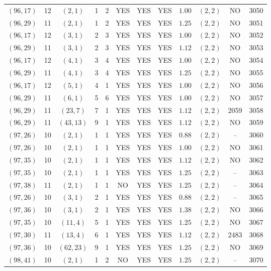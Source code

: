 \begin{longtable}{|c|c|c|c|c|c|c|c|c|c|c|c|}
$(96,17)$ & 12 & $(2,1)$ & 1 & 2 & YES & YES & YES & $1.00$ & $(2,2)$ & NO & 3050\\
$(96,29)$ & 11 & $(2,1)$ & 1 & 2 & YES & YES & YES & $1.25$ & $(2,2)$ & NO & 3051\\
$(96,17)$ & 12 & $(3,1)$ & 2 & 3 & YES & YES & YES & $1.00$ & $(2,2)$ & NO & 3052\\
$(96,29)$ & 11 & $(3,1)$ & 2 & 3 & YES & YES & YES & $1.12$ & $(2,2)$ & NO & 3053\\
$(96,17)$ & 12 & $(4,1)$ & 3 & 4 & YES & YES & YES & $1.00$ & $(2,2)$ & NO & 3054\\
$(96,29)$ & 11 & $(4,1)$ & 3 & 4 & YES & YES & YES & $1.25$ & $(2,2)$ & NO & 3055\\
$(96,17)$ & 12 & $(5,1)$ & 4 & 1 & YES & YES & YES & $1.00$ & $(2,2)$ & NO & 3056\\
$(96,29)$ & 11 & $(6,1)$ & 5 & 6 & YES & YES & YES & $1.00$ & $(2,2)$ & NO & 3057\\
$(96,29)$ & 11 & $(23,7)$ & 7 & 1 & YES & YES & YES & $1.12$ & $(2,2)$ & 2059 & 3058\\
$(96,29)$ & 11 & $(43,13)$ & 9 & 1 & YES & YES & YES & $1.12$ & $(2,2)$ & NO & 3059\\
$(97,26)$ & 10 & $(2,1)$ & 1 & 1 & YES & YES & YES & $0.88$ & $(2,2)$ & -- & 3060\\
$(97,26)$ & 10 & $(2,1)$ & 1 & 1 & YES & YES & YES & $1.00$ & $(2,2)$ & NO & 3061\\
$(97,35)$ & 10 & $(2,1)$ & 1 & 1 & YES & YES & YES & $1.12$ & $(2,2)$ & NO & 3062\\
$(97,35)$ & 10 & $(2,1)$ & 1 & 1 & YES & YES & YES & $1.25$ & $(2,2)$ & -- & 3063\\
$(97,38)$ & 11 & $(2,1)$ & 1 & 1 & NO & YES & YES & $1.25$ & $(2,2)$ & -- & 3064\\
$(97,26)$ & 10 & $(3,1)$ & 2 & 1 & YES & YES & YES & $0.88$ & $(2,2)$ & -- & 3065\\
$(97,36)$ & 10 & $(3,1)$ & 2 & 1 & YES & YES & YES & $1.38$ & $(2,2)$ & NO & 3066\\
$(97,35)$ & 10 & $(11,4)$ & 5 & 1 & YES & YES & YES & $1.25$ & $(2,2)$ & NO & 3067\\
$(97,30)$ & 11 & $(13,4)$ & 6 & 1 & YES & YES & YES & $1.12$ & $(2,2)$ & 2483 & 3068\\
$(97,36)$ & 10 & $(62,23)$ & 9 & 1 & YES & YES & YES & $1.25$ & $(2,2)$ & NO & 3069\\
$(98,41)$ & 10 & $(2,1)$ & 1 & 2 & NO & YES & YES & $1.25$ & $(2,2)$ & -- & 3070\\

\end{longtable}
